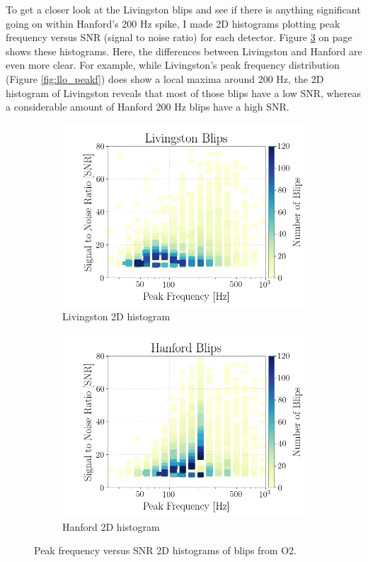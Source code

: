 \documentclass[a4paper]{article}
\begin{document}
To get a closer look at the Livingston blips and see if there is anything significant going on within Hanford's 200 Hz spike, I made 2D histograms plotting peak frequency versus SNR (signal to noise ratio) for each detector. Figure \ref{fig:hists_2d}  on page \pageref{fig:hists_2d} shows these histograms. Here, the differences between Livingston and Hanford are even more clear. For example, while Livingston's peak frequency distribution (Figure \ref{fig:llo_peakf}) does show a local maxima around 200 Hz, the 2D histogram of Livingston reveals that most of those blips have a low SNR, whereas a considerable amount of Hanford 200 Hz blips have a high SNR. 

\begin{figure}[h!]
	\centering
	\begin{subfigure}{.49\textwidth}
		\centering
		\includegraphics[width=1\linewidth]{llo_2d}
		\caption{Livingston 2D histogram}
		\label{fig:llo_2d}
	\end{subfigure}
	\begin{subfigure}{.49\textwidth}
		\centering
		\includegraphics[width=1\linewidth]{lho_2d}
		\caption{Hanford 2D histogram}
		\label{fig:lho_2d}
	\end{subfigure}
	\caption{Peak frequency versus SNR 2D histograms of blips from O2.}
	\label{fig:hists_2d}
\end{figure}
\end{document}
